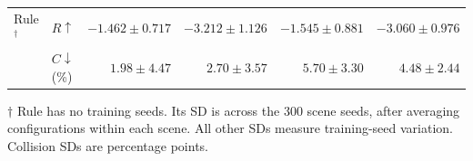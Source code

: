 {\begin{table}[!t]
\begin{tabular*}{\textwidth}{@{\extracolsep{\fill}}llrrrr@{}}
\addlinespace[2pt]
Rule$^{\dagger}$ & $R\uparrow$ & $-1.462\pm0.717$ & $-3.212\pm1.126$ & $-1.545\pm0.881$ & $-3.060\pm0.976$ \\
 & $C\downarrow$ (\%) & $1.98\pm4.47$ & $2.70\pm3.57$ & $\mathbf{5.70\pm3.30}$ & $\mathbf{4.48\pm2.44}$ \\
\bottomrule
\end{tabular*}
\par\vspace{2pt}\parbox{\textwidth}{\footnotesize
$\dagger$ Rule has no training seeds. Its SD is across the 300 scene seeds, after averaging configurations within each scene. All other SDs measure training-seed variation. Collision SDs are percentage points.}
\end{table}}

\newcommand{\HadCoreAblationTable}{%
\begin{table}[!t]
\centering\footnotesize
\setlength{\tabcolsep}{5pt}
\caption{Core design references on the formal HAD matrix: absolute reward $R=-D$ and friendly-collision mortality $C$, mean $\pm$ sample SD across three training seeds. Each configuration uses 300 common scenes. Bold marks the best mean among these five methods. SG denotes + Memory query; NoREFIL, R0, and R1 retain historical-query inputs.}
\label{tab:had-core-ablation}
\begin{tabular*}{\textwidth}{@{\extracolsep{\fill}}llrrrr@{}}
\toprule
Method & Metric & ID & $K$-OOD & $N$-OOD & Joint OOD \\
\midrule
\textbf{LEAF} & $R\uparrow$ & $\mathbf{-0.405\pm0.097}$ & $\mathbf{-0.996\pm0.233}$ & $\mathbf{-0.575\pm0.235}$ & $\mathbf{-1.097\pm0.105}$ \\
 & $C\downarrow$ (\%) & $\mathbf{1.33\pm0.45}$ & $\mathbf{1.70\pm0.62}$ & $\mathbf{6.29\pm1.32}$ & $\mathbf{4.97\pm1.26}$ \\
\addlinespace[2pt]
SG (+ Memory query) & $R\uparrow$ & $-0.527\pm0.227$ & $-1.529\pm0.734$ & $-0.998\pm0.621$ & $-1.946\pm1.229$ \\
 & $C\downarrow$ (\%) & $1.66\pm0.86$ & $2.59\pm1.78$ & $8.57\pm4.41$ & $6.65\pm4.16$ \\
\addlinespace[2pt]
NoREFIL & $R\uparrow$ & $-0.510\pm0.138$ & $-1.768\pm0.621$ & $-1.263\pm0.653$ & $-2.319\pm0.889$ \\
 & $C\downarrow$ (\%) & $2.23\pm0.77$ & $3.67\pm1.65$ & $10.71\pm3.98$ & $8.76\pm3.14$ \\
\addlinespace[2pt]
R0 & $R\uparrow$ & $-0.928\pm0.210$ & $-1.958\pm0.457$ & $-2.020\pm0.446$ & $-3.196\pm0.687$ \\

\end{tabular*}
\end{table}}
